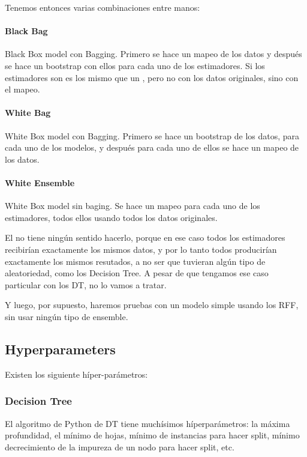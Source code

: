  Tenemos entonces varias combinaciones entre manos:

  \paragraph{Black Bag}
  Black Box model con Bagging. Primero se hace un mapeo de los datos y después se
  hace un bootstrap con ellos para cada uno de los estimadores. Si los estimadores
  son  es los mismo que un , pero no con los
  datos originales, sino con el mapeo.

  \paragraph{White Bag}
  White Box model con Bagging. Primero se hace un bootstrap de los datos, para
  cada uno de los modelos, y después para cada uno de ellos se hace un mapeo de
  los datos.

  \paragraph{White Ensemble}
  White Box model sin baging. Se hace un mapeo para cada uno de los estimadores,
  todos ellos usando todos los datos originales.


  El  no tiene ningún sentido hacerlo, porque en ese caso
  todos los estimadores recibirían exactamente los mismos datos, y por lo tanto
  todos producirían exactamente los mismos resutados, a no ser que tuvieran algún
  tipo de aleatoriedad, como los Decision Tree. A pesar de que tengamos ese caso
  particular con los DT, no lo vamos a tratar.

  Y luego, por supuesto, haremos pruebas con un modelo simple usando los RFF, sin
  usar ningún tipo de ensemble.
\subsection{Hyperparameters}

Existen los siguiente híper-parámetros:
\subsubsection*{Decision Tree}
El algoritmo de Python de DT tiene muchísimos híperparámetros: la máxima
profundidad, el mínimo de hojas, mínimo de instancias para hacer split,
mínimo decrecimiento de la impureza de un nodo para hacer split, etc.

